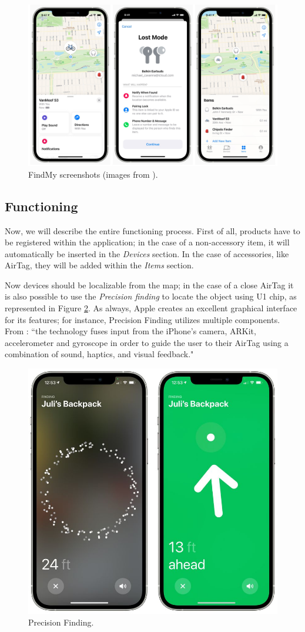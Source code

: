 \documentclass[english]{article}
\begin{document}
\begin{figure}[t]
	\centering
	\includegraphics[width=.9\textwidth]{images/findmy.jpg}
	\caption{FindMy screenshots (images from \cite{findmyscreen}).}
	\label{findmy2}
\end{figure}

\subsection{Functioning}
Now, we will describe the entire functioning process. First of all, products have to be registered within the application; in the case of a non-accessory item, it will automatically be inserted in the \textit{Devices} section. In the case of accessories, like AirTag, they will be added within the \textit{Items} section.

Now devices should be localizable from the map; in the case of a close AirTag it is also possible to use the \textit{Precision finding} to locate the object using U1 chip, as represented in Figure \ref{findmy1}. As always, Apple creates an excellent graphical interface for its features; for instance, Precision Finding utilizes multiple components. From \cite{OBoyle_2021}: ``the technology fuses input from the iPhone's camera, ARKit, accelerometer and gyroscope in order to guide the user to their AirTag using a combination of sound, haptics, and visual feedback." 

\begin{figure}[t]
	\centering
	\includegraphics[width=.6\textwidth]{images/airtag-precision-finding-2.jpg}
	\caption{Precision Finding.}
	\label{findmy1}
\end{figure}
\end{document}
